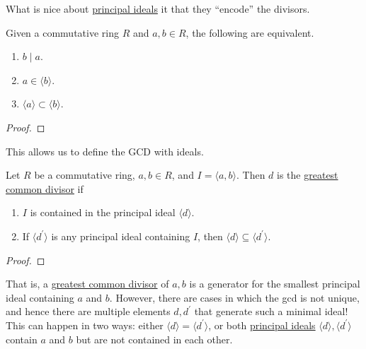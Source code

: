   What is nice about \hyperref[def:principal-ideals]{principal ideals} it that they ``encode'' the divisors. 

  \begin{theorem}
    \label{thm:principal-ideals-and-divisors}
    Given a commutative ring $R$ and $a, b \in R$, the following are equivalent. 
    \begin{enumerate}
      \item $b \mid a$. 
      \item $a \in \langle b \rangle$. 
      \item $\langle a \rangle \subset \langle b \rangle$. 
    \end{enumerate}
  \end{theorem}
  \begin{proof}
    
  \end{proof}

  This allows us to define the GCD with ideals. 

  \begin{corollary}
    \label{thm:gcd-as-a-minimal-ideal}
    Let $R$ be a commutative ring, $a, b \in R$, and $I = \langle a, b \rangle$. Then $d$ is the \hyperref[def:greatest-common-divisor]{greatest common divisor} if 
    \begin{enumerate}
      \item $I$ is contained in the principal ideal $\langle d \rangle$. 
      \item If $\langle d^\prime \rangle$ is any principal ideal containing $I$, then $\langle d \rangle \subseteq \langle d^\prime \rangle$. 
    \end{enumerate}
  \end{corollary}
  \begin{proof}
    
  \end{proof}

  That is, a \hyperref[def:greatest-common-divisor]{greatest common divisor} of $a, b$ is a generator for the smallest principal ideal containing $a$ and $b$. However, there are cases in which the gcd is not unique, and hence there are multiple elements $d, d^\prime$ that generate such a minimal ideal! This can happen in two ways: either $\langle d \rangle = \langle d^\prime \rangle$, or both \hyperref[def:principal-ideals]{principal ideals} $\langle d \rangle, \langle d^\prime \rangle$ contain $a$ and $b$ but are not contained in each other. 

